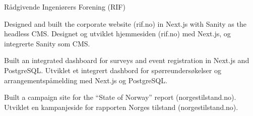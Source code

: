 \cventry
{}
{%
  {Rådgivende Ingeniørers Forening (RIF)}}
{}
{}

\begin{cvbullets}
  \item \enor
  {Designed and built the corporate website (rif.no) in Next.js with
    Sanity as the headless CMS.}
  {Designet og utviklet hjemmesiden (rif.no) med Next.js, og
    integrerte Sanity som CMS.}
  \item \enor
  {Built an integrated dashboard for surveys and event registration
    in Next.js and PostgreSQL.}
  {Utviklet et integrert dashbord for spørreundersøkelser og
    arrangementspåmelding med Next.js og PostgreSQL.}
  \item \enor
  {Built a campaign site for the ``State of Norway'' report
    (norgestilstand.no).}
  {Utviklet en kampanjeside for rapporten Norges tilstand
    (norgestilstand.no).}
\end{cvbullets}
